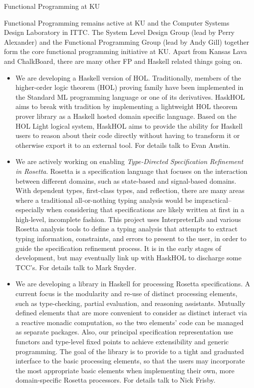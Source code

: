 \documentclass{article}
\begin{document}
\begin{hcarentry}{Functional Programming at KU}
\makeheader

Functional Programming remains active at KU and 
the Computer Systems Design Laboratory in ITTC.
The System Level Design Group (lead by Perry Alexander)
and the Functional Programming Group (lead by Andy Gill)
together form the core functional programming initiative at KU.
Apart from Kansas Lava and ChalkBoard, there are many other
FP and Haskell related things going on.

\begin{itemize}
\item We are developing a Haskell version of HOL.
Traditionally, members of the higher-order logic theorem (HOL) proving family have
been implemented in the Standard ML programming language or one of its derivatives.
HaskHOL aims to break with tradition by implementing a lightweight HOL theorem prover
library as a Haskell hosted domain specific language. Based on the HOL Light logical
system, HaskHOL aims to provide the ability for Haskell users to reason about their
code directly without having to transform it or otherwise export it to an external
tool. For details talk to Evan Austin.

\item We are actively working on enabling {\em Type-Directed Specification Refinement in Rosetta\/}. Rosetta is a specification language that focuses on the interaction between different domains, such as state-based and signal-based domains.  With dependent types, first-class types, and reflection, there are many areas where a traditional all-or-nothing typing analysis would be impractical--especially when considering that specifications are likely written at first in a high-level, incomplete fashion.  This project uses InterpreterLib  and various Rosetta analysis tools to define a typing analysis that attempts to extract typing information, constraints, and errors to present to the user, in order to guide the specification refinement process.  It is in the early stages of development, but may eventually link up with HaskHOL to discharge some TCC's. For details talk to Mark Snyder.

\item We are developing a library in Haskell for processing Rosetta specifications.
A current focus is the modularity and re-use of distinct processing
elements, such as type-checking, partial evaluation, and reasoning
assistants. Mutually defined elements that are more convenient to
consider as distinct interact via a reactive monadic computation, so
the two elements' code can be managed as separate packages. Also, our
principal specification representation use functors and type-level
fixed points to achieve extensibility and generic programming. The
goal of the library is to provide to a tight and graduated interface
to the basic processing elements, so that the users may incorporate
the most appropriate basic elements when implementing their own, more
domain-specific Rosetta processors. For details talk to Nick Frisby.


\end{itemize}
\end{hcarentry}
\end{document}
